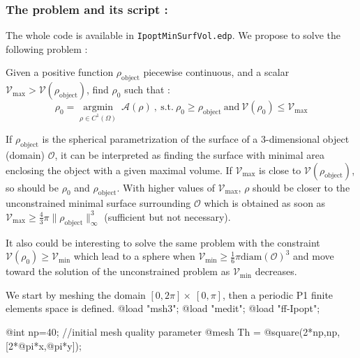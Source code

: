 \documentclass[a4paper,twoside,12pt]{book}
\begin{document}
\subsubsection{The problem and its script :}
The whole code is available in {\tt IpoptMinSurfVol.edp}. We propose to solve the following problem : 

\begin{example} 
Given a positive function $\rho_{\mathrm{object}}$ piecewise continuous, and a scalar $\mathcal{V}_{\mathrm{max}} > \mathcal{V}(\rho_{\mathrm{object}})$,
find $\rho_{0}$ such that :
$$
\rho_{0} = \underset{\rho\in C^{1}(\Omega)}{\operatorname{argmin}}\ \mathcal{A}(\rho)\ ,\ \mathrm{s.t.}\  \rho_{0}\geq\rho_{\mathrm{object}} \ \mathrm{and\ } \mathcal{V}(\rho_{0})\leq \mathcal{V}_{\mathrm{max}}
$$
\end{example}
If $\rho_{\mathrm{object}}$ is the spherical parametrization of the surface of a 3-dimensional object (domain) $\mathcal{O}$, it can be interpreted as finding the surface with minimal area enclosing the object with a given maximal volume.
If $\mathcal{V}_{\mathrm{max}}$ is close to $ \mathcal{V}(\rho_{\mathrm{object}})$, so should be $\rho_{0}$ and $\rho_{\mathrm{object}}$. With higher values of $\mathcal{V}_{\mathrm{max}}$, $\rho$ should 
be closer to the unconstrained minimal surface surrounding $\mathcal{O}$ which is obtained as soon as $\mathcal{V}_{\mathrm{max}} \geq \frac{4}{3}\pi \|\rho_{\mathrm{object}}\|_{\infty}^{3} $ (sufficient but not necessary).
\newline

It also could be interesting to solve the same problem with the constraint $\mathcal{V}(\rho_{0})\geq \mathcal{V}_{\mathrm{min}}$ which lead to a sphere when 
$\mathcal{V}_{\mathrm{min}} \geq \frac{1}{6}\pi \mathrm{diam}(\mathcal{O})^{3} $ and move toward the solution of the unconstrained problem as $\mathcal{V}_{\mathrm{min}}$ decreases.
\newline

We start by meshing the domain $[0,2\pi ]\times\ [0,\pi ]$, then a periodic P1 finite elements space is defined.
\bFF
@load "msh3";
@load "medit";
@load "ff-Ipopt";

@int np=40; //initial mesh quality parameter
@mesh Th = @square(2*np,np,[2*@pi*x,@pi*y]);
\end{document}
